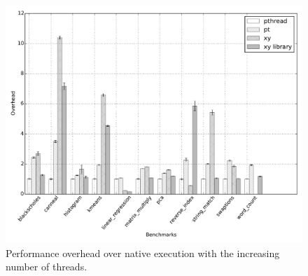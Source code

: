 
\begin{figure}[t]
\centering
\includegraphics[scale=0.35]{figure/benchmarks/times-16-threads.pdf}
\caption{Performance overhead over native execution with the increasing number of threads.
}\label{fig:overheads}
\end{figure}
